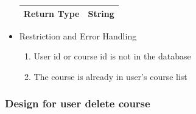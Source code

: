 \documentclass[16pt]{scrreprt}
\begin{document}
\begin{itemize}
\begin{center}
\begin{tabular}{p{5cm}p{10cm}}
        \hline
        Return Type & String\\
        \hline
    \end{tabular}
\end{center}
\item Restriction and Error Handling\\
\begin{enumerate}
	\item User id or course id is not in the database
	\item The course is already in user's course list
\end{enumerate} 
\end{itemize}

\subsubsection{Design for user delete course}
\end{document}
